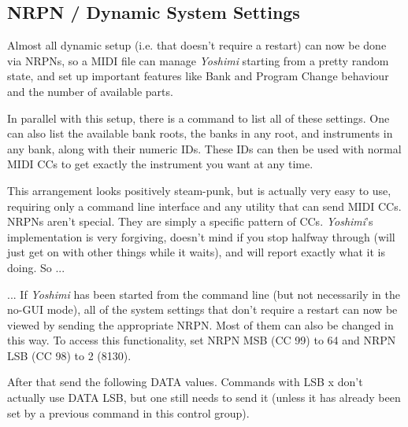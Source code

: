 \subsection{NRPN / Dynamic System Settings}
\label{subsection:nrpns_dynamic_system_settings}

   Almost all dynamic setup (i.e. that doesn't require a restart) can now be
   done via NRPNs, so a MIDI file can manage \textsl{Yoshimi} starting from a
   pretty random state, and set up important features like Bank and Program
   Change behaviour and the number of available parts.

   In parallel with this setup, there is a command to list all of these
   settings. One can also list the available bank roots, the banks in any
   root, and instruments in any bank, along with their numeric IDs. These IDs
   can then be used with normal MIDI CCs to get exactly the instrument you
   want at any time.

   This arrangement looks positively steam-punk, but is actually very easy to
   use, requiring only a command line interface and any utility that can send
   MIDI CCs. NRPNs aren't special. They are simply a specific pattern of CCs.
   \textsl{Yoshimi}'s implementation is very forgiving, doesn't mind if you
   stop halfway through (will just get on with other things while it waits),
   and will report exactly what it is doing.  So ...

   ... If \textsl{Yoshimi} has been started from the command line (but not
   necessarily in the no-GUI mode), all of the system settings that don't
   require a restart can now be viewed by sending the appropriate NRPN. Most
   of them can also be changed in this way.
   To access this functionality, set NRPN MSB (CC 99) to 64 and NRPN LSB (CC
   98) to 2 (8130).

   After that send the following DATA values. Commands with LSB x don't
   actually use DATA LSB, but one still needs to send it (unless it has
   already been set by a previous command in this control group).


